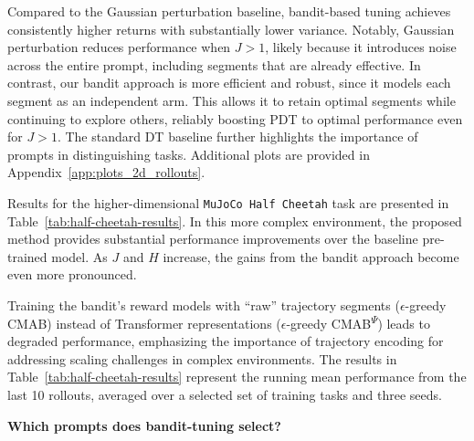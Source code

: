 \documentclass{article} %
\begin{document}
Compared to the Gaussian perturbation baseline, bandit-based tuning achieves consistently higher returns with substantially lower variance. Notably, Gaussian perturbation reduces performance when $J > 1$, likely because it introduces noise across the entire prompt, including segments that are already effective. 
In contrast, our bandit approach is more efficient and robust, since it models each segment as an independent arm.
This allows it to retain optimal segments while continuing to explore others, reliably boosting PDT to optimal performance even for $J > 1$. 
The standard DT baseline further highlights the importance of prompts in distinguishing tasks. Additional plots are provided in Appendix~\ref{app:plots_2d_rollouts}.

\sloppy
Results for the higher-dimensional \texttt{MuJoCo Half Cheetah} task are presented in Table~\ref{tab:half-cheetah-results}. In this more complex environment, the proposed method provides substantial performance improvements over the baseline pre-trained model. As $J$ and $H$ increase, the gains from the bandit approach become even more pronounced. 

Training the bandit's reward models with ``raw'' trajectory segments ($\epsilon$-greedy CMAB) instead of Transformer representations ($\epsilon$-greedy CMAB\textsuperscript{$\Psi$}) leads to degraded performance, emphasizing the importance of trajectory encoding for addressing scaling challenges in complex environments. The results in Table~\ref{tab:half-cheetah-results} represent the running mean performance from the last 10 rollouts, averaged over a selected set of training tasks and three seeds. 


\textbf{Which prompts does bandit-tuning select?}
\end{document}
